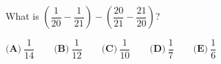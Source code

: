 What is $\left(\dfrac{1}{20}-\dfrac{1}{21}\right)-\left(\dfrac{20}{21}-\dfrac{21}{20}\right)$?

$\textbf{(A)}\ \dfrac{1}{14} \qquad\textbf{(B)}\ \dfrac{1}{12}\qquad\textbf{(C)}\ \dfrac{1}{10}\qquad\textbf{(D)}\ \dfrac{1}{7}\qquad\textbf{(E)}\ \dfrac{1}{6}$
